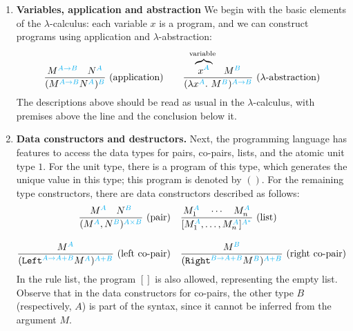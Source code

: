 \newcommand{\lambdarule}[3]{\frac{#1}{#2}\text{\ (#3)}}
\begin{enumerate}
    \item \textbf{Variables, application and abstraction} \label{item:language-variables}  We begin with the basic elements of the $\lambda$-calculus: each variable $x$ is a program, and we  can construct programs using application and $\lambda$-abstraction:
    \begin{align*}
    \lambdarule{\church M {A \to B} \quad \church N  A}{\church{(\church M {A \to B} \church N  A)}  B}{application}
    \qquad 
    \lambdarule{\myoverbrace{\church x  A}{variable}\quad  \church M  B}{\church {(\lambda \church x  A.\ \church M  B)} {A \to B}}{$\lambda$-abstraction}
    \end{align*}
    The descriptions above should be read as usual in the $\lambda$-calculus, with premises  above the line and the conclusion below it. 
    \item \textbf{Data constructors and destructors.} Next, the programming language has features to access the data types for pairs, co-pairs, lists, and the atomic unit type $1$.  For the unit type, there is a program of this type, which generates the unique value in this type; this program  is denoted by $()$. For the remaining type constructors, there are data constructors described as follows:
    \begin{align*}
    \lambdarule{\church M  A \quad \church N  B}{\church{(\church M  A,\church N  B)}{A \times B}}{pair}
    & \quad 
    \lambdarule{\church {M_1}  A \quad \cdots \quad \church {M_n}  A}{\church{[\church {M_1}  A,\ldots,\church {M_n}  A]}  {A^*}}{list} \\[0.3cm]
    \lambdarule{\church M  A}{\church{(\church \leftterm {A \to A+B}\church M A)}{A + B}}{left co-pair}
    & \quad 
    \lambdarule{\church M  B}{\church{(\church \rightterm {B \to A + B} \church M B)}{A + B}}{right co-pair}
    \end{align*}
    In the rule list, the program $[]$ is also allowed, representing the empty list. Observe that in the data constructors for co-pairs,  the other type $B$ (respectively, $A$) is part of the syntax, since it cannot be inferred from the argument $M$. 
   

\end{enumerate}
